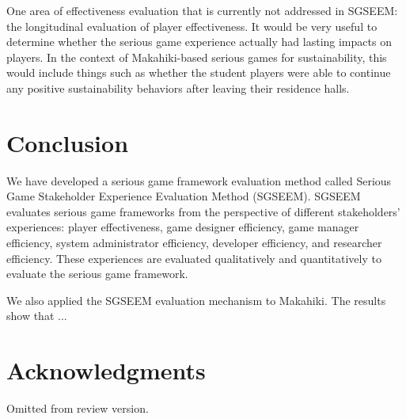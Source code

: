\documentclass{sigchi}
\begin{document}
One area of effectiveness evaluation that is currently not addressed in
SGSEEM: the longitudinal evaluation of player effectiveness. It would be
very useful to determine whether the serious game experience actually
had lasting impacts on players. In the context of Makahiki-based serious
games for sustainability, this would include things such as whether the
student players were able to continue any positive sustainability
behaviors after leaving their residence halls.

\section{Conclusion}

We have developed a serious game framework evaluation method called
Serious Game Stakeholder Experience Evaluation Method (SGSEEM). SGSEEM
evaluates serious game frameworks from the perspective of different
stakeholders' experiences: player effectiveness, game designer
efficiency, game manager efficiency, system administrator efficiency,
developer efficiency, and researcher efficiency. These experiences are
evaluated qualitatively and quantitatively to evaluate the serious game
framework.

We also applied the SGSEEM evaluation mechanism to Makahiki. The results
show that ...

\section{Acknowledgments}
Omitted from review version.


%
%
%
%
%
\balance



\end{document}
